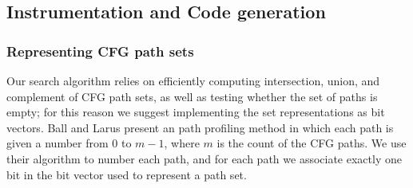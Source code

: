 \subsection{Instrumentation and Code generation}

\subsubsection{Representing CFG path sets}

Our search algorithm relies on efficiently computing intersection, union, and complement of CFG path sets, as well as testing whether the set of paths is empty; for this reason we suggest implementing the set representations as bit vectors. 
Ball and Larus \cite{Ball1996} present an path profiling method in which each path is given a number from 0 to $m-1$, where $m$ is the count of the CFG paths. 
We use their algorithm to number each path, and for each path we associate exactly one bit in the bit vector used to represent a path set.

